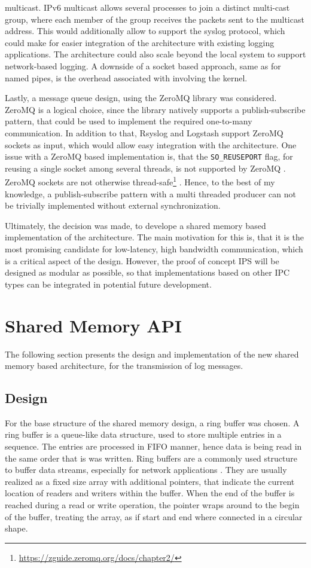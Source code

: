 multicast. \ac{IPv6} multicast allows several processes to join a distinct multi-cast group, where each member of the group receives the packets sent to the multicast address. This would additionally
allow to support the syslog protocol, which could make for easier integration of the architecture with existing logging applications. The architecture could also scale beyond the local system to support 
network-based logging. A downside of a socket based approach, same as for named pipes, is the overhead associated with involving the kernel.
\par 
Lastly, a message queue design, using the ZeroMQ library was considered. ZeroMQ is a logical choice, since the library natively supports a publish-subscribe pattern, that could be used to
implement the required one-to-many communication. In addition to that, Rsyslog and Logstash support ZeroMQ sockets as input, which would allow easy integration with the architecture.
One issue with a ZeroMQ based implementation is, that the \texttt{SO\_REUSEPORT} flag, for reusing a single socket among several threads, is not supported by ZeroMQ \cite{zeromq_issue}. 
ZeroMQ sockets are not otherwise thread-safe\footnote{\url{https://zguide.zeromq.org/docs/chapter2/}} \cite{zeromq}. Hence, to the best of my knowledge, a publish-subscribe pattern with a 
multi threaded producer can not be trivially implemented without external synchronization. 
\par 
Ultimately, the decision was made, to develope a shared memory based implementation of the architecture. The main motivation for this is, that it is the most promising
candidate for low-latency, high bandwidth communication, which is a critical aspect of the design. However, the proof of concept \ac{IPS} will be designed as modular as possible, so
that implementations based on other \ac{IPC} types can be integrated in potential future development. 

\section{Shared Memory API}

The following section presents the design and implementation of the new shared memory based architecture, for the transmission
of log messages. 

\subsection{Design} \label{sec:rbuf_design}
For the base structure of the shared memory design, a ring buffer was chosen. A ring buffer is a queue-like data structure, used to store
multiple entries in a sequence. The entries are processed in \ac{FIFO} manner, hence data is being read in the same order that is was written. 
Ring buffers are a commonly used structure to buffer data streams, especially for network applications \cite{barrington2015}.
They are usually realized as a fixed size array with additional pointers, that indicate the current location
of readers and writers within the buffer. When the end of the buffer is reached during a read or write operation, the pointer
wraps around to the begin of the buffer, treating the array, as if start and end where connected in a circular shape. 

